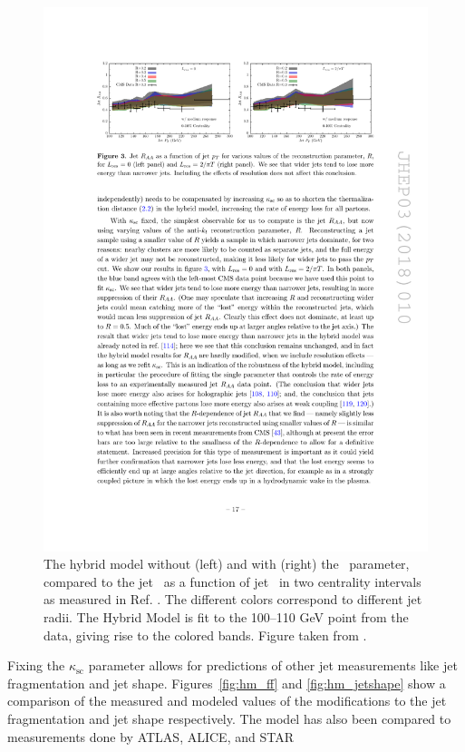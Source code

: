 \begin{figure}[htbp]
\begin{center}
\includegraphics[width=1\textwidth]{figures/jetMeasurements/HM_raa}
\caption{The hybrid model without (left) and with (right) the \Lres\ parameter, compared to the jet \RAA\ as a function of jet \pt\ in two centrality intervals as measured in Ref.
\cite{Khachatryan:2016jfl}.
The different colors correspond to different jet radii.
The Hybrid Model is fit to the 100--110 GeV point from the data, giving rise to the colored bands.
Figure taken from \cite{Hulcher:2017cpt}.
}
\label{fig:hm_fitting}
\end{center}
\end{figure}

Fixing the $\kappa_\mathrm{sc}$ parameter allows for predictions of other jet measurements like jet fragmentation and jet shape.
Figures~\ref{fig:hm_ff} and \ref{fig:hm_jetshape} show a comparison of the measured and modeled values of the modifications to the jet fragmentation and jet shape respectively.
 The model has also been compared to measurements done by ATLAS, ALICE, and STAR \cite{2013220, Abelev:2013kqa, RUSNAK:2014xfa}


